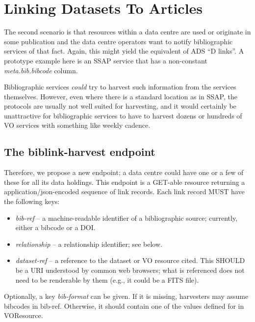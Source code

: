 \documentclass[11pt,a4paper]{ivoa}
\begin{document}


\section{Linking Datasets To Articles}

The second scenario is that resources within a data centre are used or
originate in some publication and the data centre operators want to
notify bibliographic services of that fact.  Again, this might yield the
equivalent of ADS ``D links''.  A prototype example here is an SSAP
\citep{2012ivoa.spec.0210T} service that has a non-constant
\textsl{meta.bib.bibcode} column.

Bibliographic services \emph{could} try to harvest such information from
the services themselves.  However, even where there is a standard
location as in SSAP, the protocols are usually not well suited for
harvesting, and it would certainly be unattractive for bibliographic
services to have to harvest dozens or hundreds of VO services with
something like weekly cadence.

\subsection{The biblink-harvest endpoint}

Therefore, we propose a new endpoint; a data centre could have one or a
few of these for all its data holdings.  This endpoint is a GET-able
resource returning a application/json-encoded sequence of link records.
Each link record MUST have the following keys:

\begin{itemize}
\item \emph{bib-ref} -- a machine-readable identifier of a bibliographic
source; currently, either a bibcode or a DOI.
\item \emph{relationship} -- a relationship identifier; see below.
\item \emph{dataset-ref} -- a reference to the dataset or VO resource cited.
This SHOULD be a URI understood by common web browsers; what is referenced
does not need to be renderable by them (e.g., it could be a FITS file).
\end{itemize}

Optionally, a key \emph{bib-format} can be given.  If it is missing,
harvesters may assume bibcodes in bib-ref.  Otherwise, it should contain
one of the values defined for  in VOResource.
\end{document}
